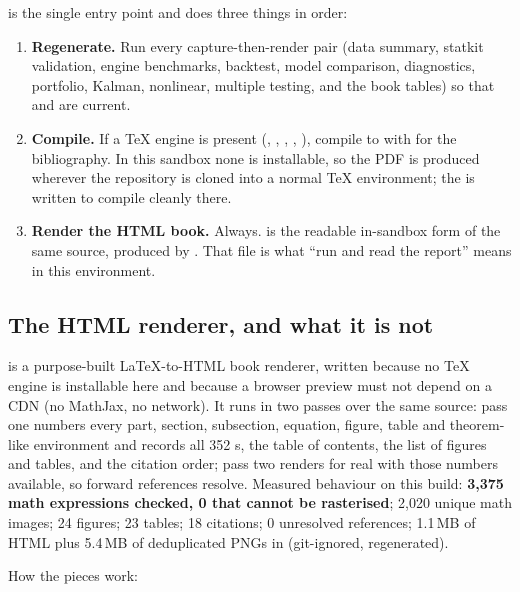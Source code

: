  is the single entry point and does three things in order:
\begin{enumerate}
  \item \textbf{Regenerate.} Run every capture-then-render pair (data summary, statkit
    validation, engine benchmarks, backtest, model comparison, diagnostics, portfolio,
    Kalman, nonlinear, multiple testing, and the book tables) so that
     and  are current.
  \item \textbf{Compile.} If a TeX engine is present (, ,
    , , ), compile  to
     with  for the bibliography. In this sandbox none is
    installable, so the PDF is produced wherever the repository is cloned into a normal TeX
    environment; the  is written to compile cleanly there.
  \item \textbf{Render the HTML book.} Always.  is the readable
    in-sandbox form of the same source, produced by . That
    file is what ``run  and read the report'' means in
    this environment.
\end{enumerate}

\subsection{The HTML renderer, and what it is not}
\label{sec:phase13:renderer}

 is a purpose-built LaTeX-to-HTML book renderer, written
because no TeX engine is installable here and because a browser preview must not depend on
a CDN (no MathJax, no network). It runs in two passes over the same source: pass one
numbers every part, section, subsection, equation, figure, table and theorem-like
environment and records all 352 s, the table of contents, the
list of figures and tables, and the citation order; pass two renders for real with those
numbers available, so forward references resolve. Measured behaviour on this build:
\textbf{3{,}375 math expressions checked, 0 that cannot be rasterised}; 2{,}020 unique
math images; 24 figures; 23 tables; 18 citations; 0 unresolved references; 1.1\,MB of HTML
plus 5.4\,MB of deduplicated PNGs in  (git-ignored, regenerated).

How the pieces work:

